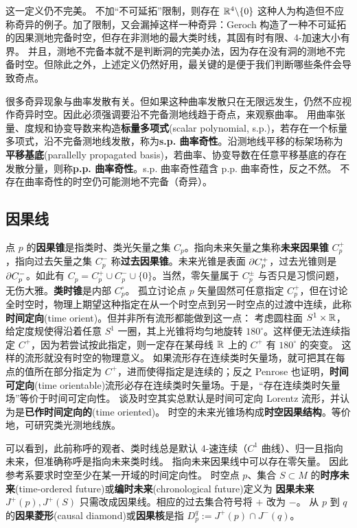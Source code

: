 这一定义仍不完美。
不加“不可延拓”限制，则存在 $\mathbb{R}^4\backslash\{0\}$ 这种人为构造但不应称奇异的例子。加了限制，又会漏掉这样一种奇异：Geroch 构造了一种不可延拓的因果测地完备时空，但存在非测地的最大类时线，其固有时有限、4-加速大小有界。
并且，测地不完备本就不是判断洞的完美办法，因为存在没有洞的测地不完备时空。但除此之外，上述定义仍然好用，最关键的是便于我们判断哪些条件会导致奇点。

很多奇异现象与曲率发散有关。但如果这种曲率发散只在无限远发生，仍然不应视作奇异时空。因此必须强调要沿不完备测地线趋于奇点，来观察曲率。
用曲率张量、度规和协变导数来构造\textbf{标量多项式}(scalar polynomial, s.p.)，若存在一个标量多项式，沿不完备测地线发散，称为\textbf{s.p. 曲率奇性}。沿测地线平移的标架场称为\textbf{平移基底}(parallelly propagated basis)，若曲率、协变导数在任意平移基底的存在发散分量，则称\textbf{p.p. 曲率奇性}。s.p. 曲率奇性蕴含 p.p. 曲率奇性，反之不然。
不存在曲率奇性的时空仍可能测地不完备（奇异）。

\subsection{因果线}

点 $p$ 的\textbf{因果锥}是指类时、类光矢量之集 $C_p$。指向未来矢量之集称\textbf{未来因果锥} $C_p^+$，指向过去矢量之集 $C_p^-$ 称\textbf{过去因果锥}。未来光锥是表面 $\partial C_p^+$，过去光锥则是 $\partial C_p^-$。如此有 $C_p=C_p^+\cup C_p^-\cup\{0\}$。当然，零矢量属于 $C_p^\pm$ 与否只是习惯问题，无伤大雅。\textbf{类时锥}是内部 $C_p^\circ$。
孤立讨论点 $p$ 矢量固然可任意指定 $C_p^+$，但在讨论全时空时，物理上期望这种指定在从一个时空点到另一时空点的过渡中连续，此称\textbf{时间定向}(time orient)。但并非所有流形都能做到这一点：
考虑圆柱面 $S^1\times\mathbb{R}$，给定度规使得沿着任意 $S^1$ 一圈，其上光锥将均匀地旋转 $180^\circ$。这样便无法连续指定 $C^+$，因为若尝试按此指定，则一定存在某母线 $\mathbb{R}$ 上的 $C^+$ 有 $180^\circ$ 的突变。
这样的流形就没有时空的物理意义。
如果流形存在连续类时矢量场，就可把其在每点的值所在部分指定为 $C^+$，进而使得指定是连续的；反之 Penrose 也证明，\textbf{时间可定向}(time orientable)流形必存在连续类时矢量场。于是，“存在连续类时矢量场”等价于时间可定向性。
谈及时空其实总默认是时间可定向 Lorentz 流形，并认为是\textbf{已作时间定向的}(time oriented)。
时空的未来光锥场构成\textbf{时空因果结构}。等价地，可研究类光测地线族。

可以看到，此前称呼的观者、类时线总是默认 4-速连续（$C^1$ 曲线）、归一且指向未来，但准确称呼是指向未来类时线。
指向未来因果线中可以存在零矢量。
因此参考系要求时空至少在某一开域的时间定向性。
时空点 $p$、集合 $S\subset M$ 的\textbf{时序未来}(time-ordered future)或\textbf{编时未来}(chronological future)定义为
\textbf{因果未来} $J^+(p),J^+(S)$ 只需改成因果线。相应的过去集合符号将 $+$ 改为 $-$。
从 $p$ 到 $q$ 的\textbf{因果菱形}(causal diamond)或\textbf{因果核}是指 $D_p^q:=J^+(p)\cap J^-(q)$。

